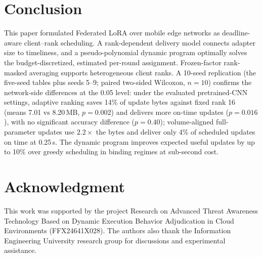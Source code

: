 \documentclass[conference]{IEEEtran}
\begin{document}
\section{Conclusion}
\label{sec:conclusion}
This paper formulated Federated LoRA over mobile edge networks as deadline-aware client--rank scheduling. A rank-dependent delivery model connects adapter size to timeliness, and a pseudo-polynomial dynamic program optimally solves the budget-discretized, estimated per-round assignment. Frozen-factor rank-masked averaging supports heterogeneous client ranks. A 10-seed replication (the five-seed tables plus seeds 5--9; paired two-sided Wilcoxon, $n{=}10$) confirms the network-side differences at the 0.05 level: under the evaluated pretrained-CNN settings, adaptive ranking saves 14\% of update bytes against fixed rank 16 (means 7.01 vs 8.20\,MB, $p{=}0.002$) and delivers more on-time updates ($p{=}0.016$), with no significant accuracy difference ($p{=}0.40$); volume-aligned full-parameter updates use $2.2\times$ the bytes and deliver only 4\% of scheduled updates on time at 0.25\,s. The dynamic program improves expected useful updates by up to 10\% over greedy scheduling in binding regimes at sub-second cost.

\section*{Acknowledgment}
This work was supported by the project Research on Advanced Threat Awareness Technology Based on Dynamic Execution Behavior Adjudication in Cloud Environments (FFX24641X028). The authors also thank the Information Engineering University research group for discussions and experimental assistance.



\end{document}
